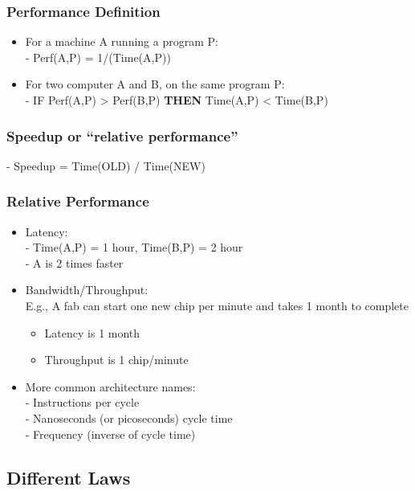 \documentclass[12pt]{article}
\begin{document}
        \subsubsection{Performance Definition}
        \begin{itemize}
            \item {For a machine A running a program P:}\\
            - Perf(A,P) = 1/(Time(A,P))
            \item {For two computer A and B, on the same program P:}\\
            - IF Perf(A,P) > Perf(B,P) \textbf{THEN} Time(A,P) < Time(B,P)
        \end{itemize}
        \subsubsection{Speedup or “relative performance”}
        - Speedup = Time(OLD) / Time(NEW)
        \subsubsection{Relative Performance}
        \begin{itemize}
            \item {Latency:}\\
            - Time(A,P) = 1 hour, Time(B,P) = 2 hour\\
            - A is 2 times faster
            \item {Bandwidth/Throughput:}\\
            E.g., A fab can start one new chip per minute and takes 1 month to complete
                \begin{itemize}
                    \item {Latency is 1 month}\\
                    \item {Throughput is 1 chip/minute}\\
                \end{itemize}
            \item {More common architecture names:}\\
            - Instructions per cycle\\
            - Nanoseconds (or picoseconds) cycle time\\
            - Frequency (inverse of cycle time)
        \end{itemize}
        \subsection{Different Laws}
\end{document}
